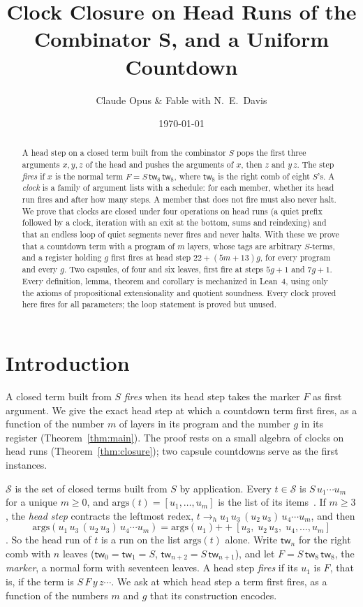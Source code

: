 \documentclass[11pt]{amsart}
\title[Clock Closure]{Clock Closure on Head Runs of the Combinator $\bm{S}$, and a Uniform Countdown}
\author{Claude Opus \& Fable with N.\ E.\ Davis}
\date{\today}
\theoremstyle{definition}
\newcommand{\Ter}{\mathcal S}
\newcommand{\app}{\mathbin{+\!\!+}}
\newcommand{\args}{\mathrm{args}}
\newcommand{\tw}[1]{\mathsf{tw}_{#1}}
\begin{document}
\begin{abstract}
A head step on a closed term built from the combinator $S$ pops the first three arguments
$x,y,z$ of the head and pushes the arguments of $x$, then $z$ and $y\,z$. The step \emph{fires} if
$x$ is the normal term $F=S\,\tw8\,\tw8$, where $\tw8$ is the right comb of eight $S$'s. A
\emph{clock} is a family of argument lists with a schedule: for each member, whether its head run
fires and after how many steps. A member that does not fire must also never halt. We prove that
clocks are closed under four operations on head runs (a quiet prefix followed by a clock, iteration
with an exit at the bottom, sums and reindexing) and that an endless loop of quiet segments never
fires and never halts. With these we prove that a countdown term with a program of $m$ layers,
whose tags are arbitrary $S$-terms, and a register holding $g$ first fires at head step
$22+(5m+13)g$, for every program and every $g$. Two capsules, of four and six leaves, first fire at
steps $5g+1$ and $7g+1$. Every definition, lemma, theorem and corollary is mechanized in Lean~4,
using only the axioms of propositional extensionality and quotient soundness. Every clock proved
here fires for all parameters; the loop statement is proved but unused.
\end{abstract}

\maketitle

\section{Introduction}

A closed term built from $S$ \emph{fires} when its head step takes the marker $F$ as first
argument. We give the exact head step at which a countdown term first fires, as a function of the
number $m$ of layers in its program and the number $g$ in its register
(Theorem~\ref{thm:main}). The proof rests on a small algebra of clocks on head runs
(Theorem~\ref{thm:closure}); two capsule countdowns serve as the first instances.

$\Ter$ is the set of closed terms built from $S$ by application. Every $t\in\Ter$ is
$S\,u_1\cdots u_m$ for a unique $m\ge0$, and $\args(t)=[u_1,\dots,u_m]$ is the list of its
items~\citep{s1,s11}. If $m\ge3$, the \emph{head step} contracts the leftmost redex,
$t\to_h u_1\,u_3\,(u_2\,u_3)\,u_4\cdots u_m$, and then
\begin{equation}\label{eq:head}
\args(u_1\,u_3\,(u_2\,u_3)\,u_4\cdots u_m)=\args(u_1)\app[u_3,\;u_2\,u_3,\;u_4,\dots,u_m]
\end{equation}
\citep[equation~(1)]{s1}. So the head run of $t$ is a run on the list $\args(t)$ alone. Write $\tw n$ for the
right comb with $n$ leaves ($\tw0=\tw1=S$, $\tw{n+2}=S\,\tw{n+1}$), and let $F=S\,\tw8\,\tw8$, the
\emph{marker}, a normal form with seventeen leaves. A head step \emph{fires} if its $u_1$ is $F$,
that is, if the term is $S\,F\,y\,z\cdots$. We ask at which head step a term first fires, as a
function of the numbers $m$ and $g$ that its construction encodes.
\end{document}
